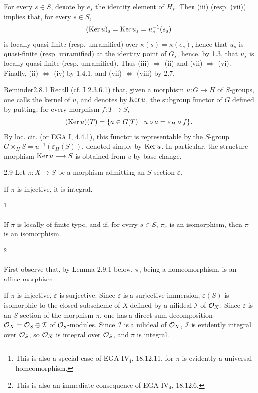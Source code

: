 For every $s\in S$, denote by $e_s$ the identity element of $H_s$. Then (iii) (resp. (vii)) implies that, for every $s\in S$,
\[
(\operatorname{Ker} u)_s=\operatorname{Ker} u_s=u_s^{-1}(e_s)
\]
is locally quasi-finite (resp. unramified) over $\kappa(s)=\kappa(e_s)$, hence that $u_s$ is quasi-finite (resp. unramified) at the identity point of $G_s$, hence, by 1.3, that $u_s$ is locally quasi-finite (resp. unramified). Thus (iii) $\Rightarrow$ (ii) and (vii) $\Rightarrow$ (vi). Finally, (ii) $\Leftrightarrow$ (iv) by 1.4.1, and (vii) $\Leftrightarrow$ (viii) by 2.7.
\begin{enoncerm}{Reminder}{2.8.1}\label{VIB.2.8.1}
Recall (cf. I 2.3.6.1) that, given a morphism $u:G\to H$ of $S$-groups, one calls the kernel of $u$, and denotes by $\operatorname{Ker} u$, the subgroup functor of $G$ defined by putting, for every morphism $f:T\to S$,
\[
(\operatorname{Ker} u)(T)=\{a\in G(T)\mid u\circ a=\varepsilon_H\circ f\}.
\]
By loc. cit. (or EGA I, 4.4.1), this functor is representable by the $S$-group $G\times_HS=u^{-1}(\varepsilon_H(S))$, denoted simply by $\operatorname{Ker} u$. In particular, the structure morphism $\operatorname{Ker} u\longrightarrow S$ is obtained from $u$ by base change.
\end{enoncerm}
\begin{lemma}{2.9}\label{VIB.2.9}
Let $\pi:X\to S$ be a morphism admitting an $S$-section $\varepsilon$.
\begin{enumeratei}
\item If $\pi$ is injective, it is integral.\begingroup\renewcommand{\thefootnote}{*}\addtocounter{footnote}{-1}\footnote{This is also a special case of EGA IV$_4$, 18.12.11, for $\pi$ is evidently a universal homeomorphism.}\endgroup
\item If $\pi$ is locally of finite type, and if, for every $s\in S$, $\pi_s$ is an isomorphism, then $\pi$ is an isomorphism.\begingroup\renewcommand{\thefootnote}{**}\addtocounter{footnote}{-1}\footnote{This is also an immediate consequence of EGA IV$_4$, 18.12.6.}\endgroup
\end{enumeratei}
\end{lemma}
First observe that, by Lemma 2.9.1 below, $\pi$, being a homeomorphism, is an affine morphism.

If $\pi$ is injective, $\varepsilon$ is surjective. Since $\varepsilon$ is a surjective immersion, $\varepsilon(S)$ is isomorphic to the closed subscheme of $X$ defined by a nilideal $\mathcal I$ of $\mathcal{O}_X$. Since $\varepsilon$ is an $S$-section of the morphism $\pi$, one has a direct sum decomposition $\mathcal{O}_X=\mathcal{O}_S\oplus\mathcal I$ of $\mathcal{O}_S$-modules. Since $\mathcal I$ is a nilideal of $\mathcal{O}_X$, $\mathcal I$ is evidently integral over $\mathcal{O}_S$, so $\mathcal{O}_X$ is integral over $\mathcal{O}_S$, and $\pi$ is integral.

